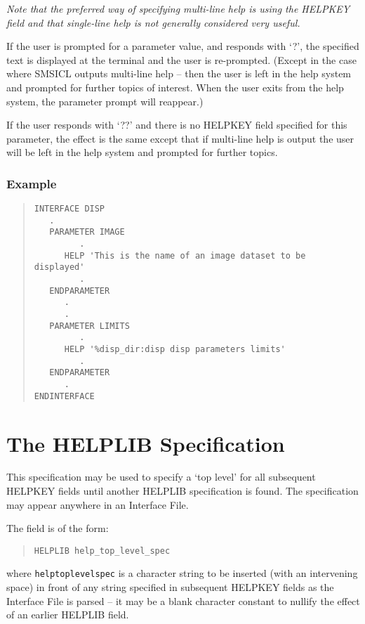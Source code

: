 \documentclass[twoside,11pt]{article}
\newcommand{\xlabel}[1]{}
\renewcommand{\_}{\texttt{\symbol{95}}}
\begin{document}
{\em Note that the preferred way of specifying multi-line help
is using the HELPKEY field and that single-line help is not generally
considered very useful.}

If the user is prompted for a parameter value, and responds with `?',
the specified text is displayed at the terminal and the user is re-prompted.
(Except in the case where SMSICL outputs multi-line help -- then the user
is left in the help system and prompted for further topics of interest.
When the user exits from the help system, the parameter prompt will
reappear.)

If the user responds with `??' and there is no HELPKEY
field specified for this parameter, the effect is the same except that
if multi-line help is output the user will 
be left in the help system and prompted for further topics.

\subsubsection*{Example}
\begin{quote} \begin{verbatim}
INTERFACE DISP
   .
   PARAMETER IMAGE
         .
      HELP 'This is the name of an image dataset to be displayed'
         .
   ENDPARAMETER
      .
      .
   PARAMETER LIMITS
         .
      HELP '%disp_dir:disp disp parameters limits'
         .
   ENDPARAMETER
      .
ENDINTERFACE
\end{verbatim} \end{quote}

\section{The HELPLIB Specification\xlabel{the_helplib_specification}
\label{helplib}}

This specification may be used to specify a `top level' for all subsequent 
HELPKEY fields until another HELPLIB specification is found. The specification
may appear anywhere in an Interface File.

The field is of the form:
\begin{quote} \begin{verbatim}
HELPLIB help_top_level_spec
\end{verbatim} \end{quote}
where \texttt{help\_top\_level\_spec} is a character string to be inserted (with an 
intervening space) in front of any string specified in subsequent HELPKEY
fields as the Interface File is parsed --
it may be a blank character constant to nullify the 
effect of an earlier HELPLIB field.
\end{document}
